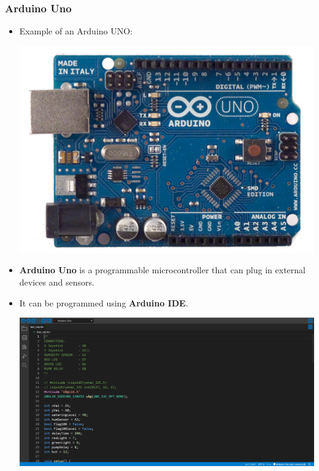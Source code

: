 \documentclass[12pt]{article}
\begin{document}
        \subsubsection{Arduino Uno}
            \begin{itemize}
                \item Example of an Arduino UNO:
                \begin{center}
                    \includegraphics[scale = 0.6]{./images/arduino uno.png}     
                \end{center}
                \item \textbf{Arduino Uno} is a programmable microcontroller that can plug in external devices and sensors.
                \item It can be programmed using \textbf{Arduino IDE}.
                \begin{center}
                    \includegraphics[scale = 0.3]{./images/arduino ide.png}    
                \end{center}
            \end{itemize}
\end{document}
